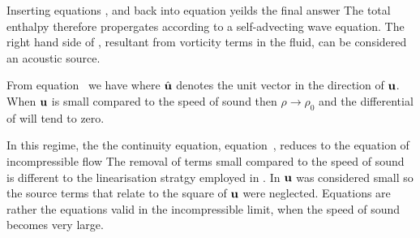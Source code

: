 Inserting equations ,  and  back into equation  yeilds the final answer 
The total enthalpy therefore propergates according to a self-advecting wave equation.
The right hand side of , resultant from vorticity terms in the fluid, can be considered an acoustic source.

From equation~ we have
where $\hat {\textbf{u}}$ denotes the unit vector in the direction of $\textbf{u}$.
When $\textbf{u}$ is small compared to the speed of sound then $\rho \rightarrow \rho_0$
and the differential of will tend to zero.

In this regime, the the continuity equation, equation~, reduces to the equation of incompressible flow
The removal of terms small compared to the speed of sound is different to the linearisation stratgy employed in .
In  $\textbf{u}$ was considered small so the source terms that relate to the square of $\textbf{u}$ were neglected.
Equations  are rather the equations valid in the incompressible limit,
when the speed of sound becomes very large.
  


